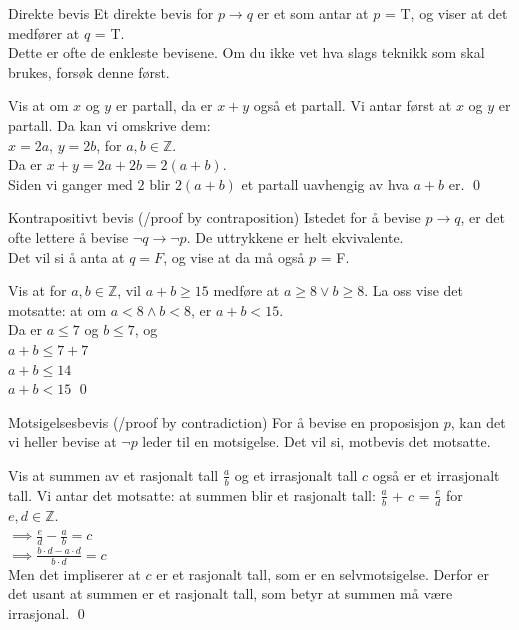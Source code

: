 \begin{frame}{Direkte bevis}
    Et direkte bevis for $p \rightarrow q$ er et som antar at $p$ = T, og viser at det medfører at $q$ = T.\\
    Dette er ofte de enkleste bevisene. Om du ikke vet hva slags teknikk som skal brukes, forsøk denne først.\\
    
    \begin{block}{Vis at om $x$ og $y$ er partall, da er $x + y$ også et partall.}
        Vi antar først at $x$ og $y$ er partall. Da kan vi omskrive dem:\\
        $x = 2a$, $y = 2b$, for $a, b \in \mathbb{Z}$.\\
        Da er $x + y = 2a + 2b = 2(a + b)$.\\
        Siden vi ganger med $2$ blir $2(a + b)$ et partall uavhengig av hva $a + b$ er.
        \qed
    \end{block}
\end{frame}

\begin{frame}{Kontrapositivt bevis (/proof by contraposition)}
    Istedet for å bevise $p \rightarrow q$, er det ofte lettere å bevise $\lnot q \rightarrow \lnot p$. De uttrykkene er helt ekvivalente.\\
    Det vil si å anta at $q = F$, og vise at da må også $p$ = F.\\
    
    \begin{block}{Vis at for $a, b \in \mathbb{Z}$, vil $a + b \geq 15$ medføre at $a \geq 8 \lor b \geq 8$.}
        La oss vise det motsatte: at om $a <8 \land b < 8$, er $a + b < 15$.\\
        Da er $a \leq 7$ og $b \leq 7$, og\\
        $a + b \leq 7 + 7$\\
        $a + b \leq 14$\\
        $a + b < 15$
        \qed
    \end{block}
\end{frame}

\begin{frame}{Motsigelsesbevis (/proof by contradiction)}
    For å bevise en proposisjon $p$, kan det vi heller bevise at $\lnot p$ leder til en motsigelse. Det vil si, motbevis det motsatte.
    
    \begin{block}{Vis at summen av et rasjonalt tall $\frac{a}{b}$ og et irrasjonalt tall $c$ også er et irrasjonalt tall.}
    Vi antar det motsatte: at summen blir et rasjonalt tall: $\frac{a}{b}$ + $c$ = $\frac{e}{d}$ for $e, d \in \mathbb{Z}$.\\
    $\implies \frac{e}{d} - \frac{a}{b} = c$\\
    $\implies \frac{b\cdot d - a \cdot d}{b\cdot d} = c$\\
    Men det impliserer at $c$ er et rasjonalt tall, som er en selvmotsigelse. Derfor er det usant at summen er et rasjonalt tall, som betyr at summen må være irrasjonal. 
    \qed
    
    \end{block}
\end{frame}

